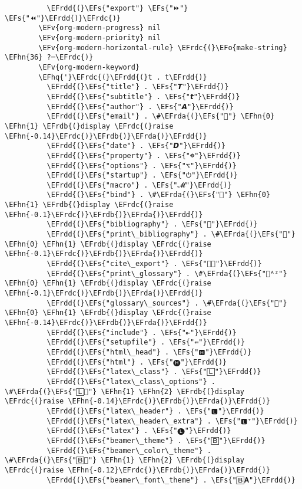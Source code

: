 \documentclass[12pt]{article}
\theoremstyle{plain}%
\theoremstyle{definition}
\theoremstyle{remark}
\newcommand{\EFs}[1]{\textcolor{EFs}{#1}} %
\newcommand{\EFv}[1]{\textcolor{EFv}{#1}} %
\newcommand{\EFo}[1]{\textcolor{EFo}{#1}} %
\newcommand{\EFhn}[1]{\textcolor{EFhn}{\textbf{#1}}} %
\newcommand{\EFhq}[1]{\textcolor{EFhq}{#1}} %
\newcommand{\EFrda}[1]{\textcolor{EFrda}{#1}} %
\newcommand{\EFrdb}[1]{\textcolor{EFrdb}{#1}} %
\newcommand{\EFrdc}[1]{\textcolor{EFrdc}{#1}} %
\newcommand{\EFrdd}[1]{\textcolor{EFrdd}{#1}} %
\begin{document}
\begin{Code}
\begin{Verbatim}
          \EFrdd{(}\EFs{"export"} \EFs{"⏩"} \EFs{"⏪"}\EFrdd{)}\EFrdc{)}
        \EFv{org-modern-progress} nil
        \EFv{org-modern-priority} nil
        \EFv{org-modern-horizontal-rule} \EFrdc{(}\EFo{make-string} \EFhn{36} ?─\EFrdc{)}
        \EFv{org-modern-keyword}
        \EFhq{'}\EFrdc{(}\EFrdd{(}t . t\EFrdd{)}
          \EFrdd{(}\EFs{"title"} . \EFs{"𝙏"}\EFrdd{)}
          \EFrdd{(}\EFs{"subtitle"} . \EFs{"𝙩"}\EFrdd{)}
          \EFrdd{(}\EFs{"author"} . \EFs{"𝘼"}\EFrdd{)}
          \EFrdd{(}\EFs{"email"} . \#\EFrda{(}\EFs{""} \EFhn{0} \EFhn{1} \EFrdb{(}display \EFrdc{(}raise \EFhn{-0.14}\EFrdc{)}\EFrdb{)}\EFrda{)}\EFrdd{)}
          \EFrdd{(}\EFs{"date"} . \EFs{"𝘿"}\EFrdd{)}
          \EFrdd{(}\EFs{"property"} . \EFs{"☸"}\EFrdd{)}
          \EFrdd{(}\EFs{"options"} . \EFs{"⌥"}\EFrdd{)}
          \EFrdd{(}\EFs{"startup"} . \EFs{"⏻"}\EFrdd{)}
          \EFrdd{(}\EFs{"macro"} . \EFs{"𝓜"}\EFrdd{)}
          \EFrdd{(}\EFs{"bind"} . \#\EFrda{(}\EFs{""} \EFhn{0} \EFhn{1} \EFrdb{(}display \EFrdc{(}raise \EFhn{-0.1}\EFrdc{)}\EFrdb{)}\EFrda{)}\EFrdd{)}
          \EFrdd{(}\EFs{"bibliography"} . \EFs{""}\EFrdd{)}
          \EFrdd{(}\EFs{"print\_bibliography"} . \#\EFrda{(}\EFs{""} \EFhn{0} \EFhn{1} \EFrdb{(}display \EFrdc{(}raise \EFhn{-0.1}\EFrdc{)}\EFrdb{)}\EFrda{)}\EFrdd{)}
          \EFrdd{(}\EFs{"cite\_export"} . \EFs{"⮭"}\EFrdd{)}
          \EFrdd{(}\EFs{"print\_glossary"} . \#\EFrda{(}\EFs{"ᴬᶻ"} \EFhn{0} \EFhn{1} \EFrdb{(}display \EFrdc{(}raise \EFhn{-0.1}\EFrdc{)}\EFrdb{)}\EFrda{)}\EFrdd{)}
          \EFrdd{(}\EFs{"glossary\_sources"} . \#\EFrda{(}\EFs{""} \EFhn{0} \EFhn{1} \EFrdb{(}display \EFrdc{(}raise \EFhn{-0.14}\EFrdc{)}\EFrdb{)}\EFrda{)}\EFrdd{)}
          \EFrdd{(}\EFs{"include"} . \EFs{"⇤"}\EFrdd{)}
          \EFrdd{(}\EFs{"setupfile"} . \EFs{"⇚"}\EFrdd{)}
          \EFrdd{(}\EFs{"html\_head"} . \EFs{"🅷"}\EFrdd{)}
          \EFrdd{(}\EFs{"html"} . \EFs{"🅗"}\EFrdd{)}
          \EFrdd{(}\EFs{"latex\_class"} . \EFs{"🄻"}\EFrdd{)}
          \EFrdd{(}\EFs{"latex\_class\_options"} . \#\EFrda{(}\EFs{"🄻"} \EFhn{1} \EFhn{2} \EFrdb{(}display \EFrdc{(}raise \EFhn{-0.14}\EFrdc{)}\EFrdb{)}\EFrda{)}\EFrdd{)}
          \EFrdd{(}\EFs{"latex\_header"} . \EFs{"🅻"}\EFrdd{)}
          \EFrdd{(}\EFs{"latex\_header\_extra"} . \EFs{"🅻⁺"}\EFrdd{)}
          \EFrdd{(}\EFs{"latex"} . \EFs{"🅛"}\EFrdd{)}
          \EFrdd{(}\EFs{"beamer\_theme"} . \EFs{"🄱"}\EFrdd{)}
          \EFrdd{(}\EFs{"beamer\_color\_theme"} . \#\EFrda{(}\EFs{"🄱"} \EFhn{1} \EFhn{2} \EFrdb{(}display \EFrdc{(}raise \EFhn{-0.12}\EFrdc{)}\EFrdb{)}\EFrda{)}\EFrdd{)}
          \EFrdd{(}\EFs{"beamer\_font\_theme"} . \EFs{"🄱𝐀"}\EFrdd{)}

\end{Verbatim}
\end{Code}
\end{document}
